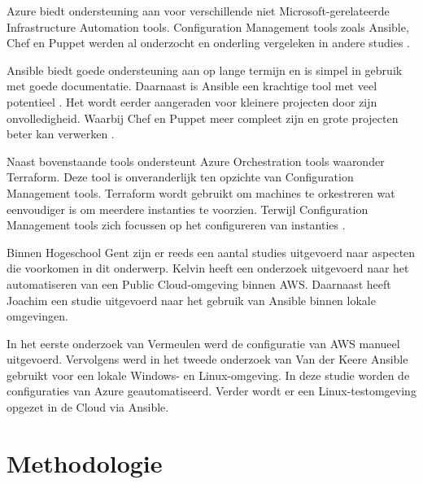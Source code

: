 Azure biedt ondersteuning aan voor verschillende niet Microsoft-gerelateerde Infrastructure Automation tools. Configuration Management tools zoals Ansible, Chef en Puppet werden al onderzocht en onderling vergeleken in andere studies \autocite{Microsoft2022a}. 

Ansible biedt goede ondersteuning aan op \newline lange termijn en is simpel in gebruik met goede documentatie. Daarnaast is Ansible een krachtige tool met veel potentieel \autocite{Masek2018}. Het wordt eerder aangeraden voor kleinere projecten door zijn onvolledigheid. Waarbij Chef en Puppet meer compleet zijn en grote projecten beter kan verwerken \autocite{Bertram2016}. 

Naast bovenstaande tools ondersteunt Azure Orchestration tools waaronder Terraform. Deze tool is onveranderlijk ten opzichte van Configuration Management tools. Terraform wordt gebruikt om machines te orkestreren wat eenvoudiger is om meerdere instanties te voorzien. Terwijl Configuration Management tools zich focussen op het configureren van instanties \autocite{Brikman2016}.

Binnen Hogeschool Gent zijn er reeds een aantal studies uitgevoerd naar aspecten die voorkomen in dit onderwerp. Kelvin \textcite{Vermeulen2021} heeft een onderzoek uitgevoerd naar het automatiseren van een Public Cloud-omgeving binnen AWS. Daarnaast heeft Joachim \textcite{VandeKeere2021} een studie uitgevoerd naar het gebruik van Ansible binnen lokale omgevingen. 

In het eerste onderzoek van Vermeulen werd de configuratie van AWS manueel uitgevoerd. Vervolgens werd in het tweede onderzoek van Van der Keere Ansible gebruikt voor een lokale \newline Windows- en Linux-omgeving. In deze studie worden de configuraties van Azure geautomatiseerd. Verder wordt er een Linux-testomgeving opgezet in de Cloud via Ansible.

\section{Methodologie}%
\label{sec:methodologie}

